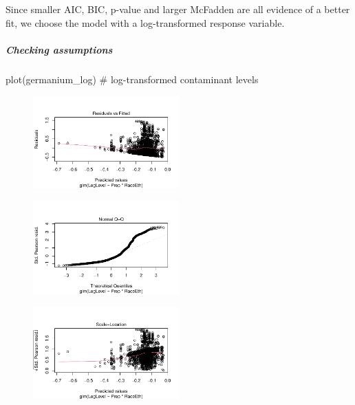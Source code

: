 \documentclass[
  letterpaper,
  DIV=11,
  numbers=noendperiod]{scrartcl}
\let\oldsubparagraph\subparagraph
\renewcommand{\subparagraph}[1]{\oldsubparagraph{#1}\mbox{}}
\newenvironment{Shaded}{\begin{snugshade}}{\end{snugshade}}
\newcommand{\CommentTok}[1]{\textcolor[rgb]{0.37,0.37,0.37}{#1}}
\newcommand{\FunctionTok}[1]{\textcolor[rgb]{0.28,0.35,0.67}{#1}}
\newcommand{\NormalTok}[1]{\textcolor[rgb]{0.00,0.23,0.31}{#1}}
\begin{document}
Since smaller AIC, BIC, p-value and larger McFadden are all evidence of
a better fit, we choose the model with a log-transformed response
variable.

\hypertarget{checking-assumptions}{%
\subparagraph{Checking assumptions}\label{checking-assumptions}}

\begin{Shaded}
\begin{Highlighting}[]
\FunctionTok{plot}\NormalTok{(germanium\_log) }\CommentTok{\# log{-}transformed contaminant levels}
\end{Highlighting}
\end{Shaded}

\begin{figure}[H]

{\centering \includegraphics[width=0.5\textwidth,height=\textheight]{appendix_files/figure-pdf/unnamed-chunk-3-1.pdf}

}

\end{figure}

\begin{figure}[H]

{\centering \includegraphics[width=0.5\textwidth,height=\textheight]{appendix_files/figure-pdf/unnamed-chunk-3-2.pdf}

}

\end{figure}

\begin{figure}[H]

{\centering \includegraphics[width=0.5\textwidth,height=\textheight]{appendix_files/figure-pdf/unnamed-chunk-3-3.pdf}

}

\end{figure}
\end{document}
